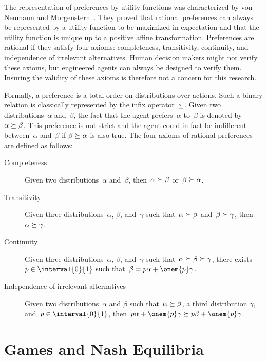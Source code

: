 \begin{note}
The representation of preferences by utility functions was characterized by von Neumann and Morgenstern~\cite{von-neumann_morgenstern:1947}.
They proved that rational preferences can always be represented by a utility function to be maximized in expectation and that the utility function is unique up to a positive affine transformation.
Preferences are rational if they satisfy four axioms: completeness, transitivity, continuity, and independence of irrelevant alternatives.
Human decision makers might not verify these axioms, but engineered agents can always be designed to verify them.
Insuring the validity of these axioms is therefore not a concern for this research.

Formally, a preference is a total order on distributions over actions.
Such a binary relation is classically represented by the infix operator~\(\succeq\).
Given two distributions~\(\alpha\) and~\(\beta\), the fact that the agent prefers~\(\alpha\) to~\(\beta\) is denoted by~\(\alpha \succeq \beta\).
This preference is not strict and the agent could in fact be indifferent between~\(\alpha\) and~\(\beta\) if \(\beta \succeq \alpha\) is also true.
The four axioms of rational preferences are defined as follows:
\begin{description}
  \item[Completeness]
    Given two distributions~\(\alpha\) and~\(\beta\), then~\(\alpha \succeq \beta\) or~\(\beta \succeq \alpha\).
  \item[Transitivity]
    Given three distributions~\(\alpha\), \(\beta\), and~\(\gamma\) such that~\(\alpha \succeq \beta\) and~\(\beta \succeq \gamma\), then~\(\alpha \succeq \gamma\).
  \item[Continuity]
    Given three distributions~\(\alpha\), \(\beta\), and~\(\gamma\) such that~\(\alpha \succeq \beta \succeq \gamma\), there exists~\(p \in \interval{0}{1}\) such that~\(\beta = p \alpha + \onem{p} \gamma\).
  \item[Independence of irrelevant alternatives]
    Given two distributions~\(\alpha\) and \(\beta\) such that~\(\alpha \succeq \beta\), a third distribution \(\gamma\), and~\(p \in \interval{0}{1}\), then~\(p \alpha + \onem{p} \gamma \pref p \beta + \onem{p} \gamma\).
\end{description}
\end{note}


\section{Games and Nash Equilibria}

